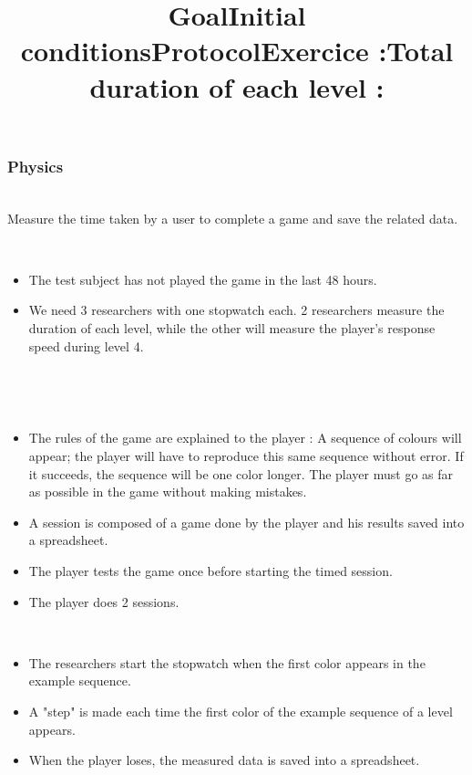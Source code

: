 \documentclass[12pt, openany, twocolumn]{article}
\begin{document}
        \subsubsection{Physics}
            \title{\textbf{Goal}} \\
            Measure the time taken by a user to complete a game and save the related data. \\
            \title{\textbf{Initial conditions}} \\
                \begin{itemize}
                    \item{The test subject has not played the game in the last 48 hours.} \\
                    \item{We need 3 researchers with one stopwatch each. 2 researchers measure the duration of each level, while the other will measure the player's response speed during level 4.} \\
                \end{itemize}
            \title{\textbf{Protocol}} \\
                \title{Exercice :}\\
                    \begin{itemize}
                        \item{The rules of the game are explained to the player : A sequence of colours will appear; the player will have to reproduce this same sequence without error. If it succeeds, the sequence will be one color longer. The player must go as far as possible in the game without making mistakes.} \\
                        \item{A session is composed of a game done by the player and his results saved into a spreadsheet.} \\
                        \item{The player tests the game once before starting the timed session.} \\  
                        \item{The player does 2 sessions.} \\
                    \end{itemize}
                \title{Total duration of each level :}\\
                    \begin{itemize}
                        \item{The researchers start the stopwatch when the first color appears in the example sequence.} \\
                        \item{A "step" is made each time the first color of the example sequence of a level appears.} \\
                        \item{When the player loses, the measured data is saved into a spreadsheet.} \\
                    \end{itemize}
\end{document}
